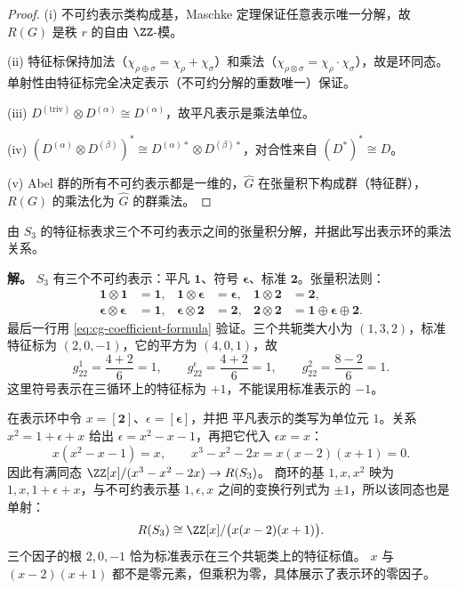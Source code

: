 \begin{proof}
(i) 不可约表示类构成基，Maschke 定理保证任意表示唯一分解，故 $R(G)$ 是秩 $r$ 的自由 $\ZZ$-模。

(ii) 特征标保持加法（$\chi_{\rho\oplus\sigma}=\chi_\rho+\chi_\sigma$）和乘法（$\chi_{\rho\otimes\sigma}=\chi_\rho\cdot\chi_\sigma$），故是环同态。单射性由特征标完全决定表示（不可约分解的重数唯一）保证。

(iii) $D^{(\mathrm{triv})}\otimes D^{(\alpha)}\cong D^{(\alpha)}$，故平凡表示是乘法单位。

(iv) $(D^{(\alpha)}\otimes D^{(\beta)})^*\cong D^{(\alpha)*}\otimes D^{(\beta)*}$，对合性来自 $(D^*)^*\cong D$。

(v) Abel 群的所有不可约表示都是一维的，$\hat G$ 在张量积下构成群（特征群），$R(G)$ 的乘法化为 $\hat G$ 的群乘法。
\end{proof}

\begin{example}[{$S_3$ 的表示环}]
由 $S_3$ 的特征标表求三个不可约表示之间的张量积分解，并据此写出表示环的乘法关系。

\textbf{解。} $S_3$ 有三个不可约表示：平凡 $\mathbf{1}$、符号 $\boldsymbol\epsilon$、标准 $\mathbf{2}$。张量积法则：
\begin{align*}
\mathbf{1}\otimes\mathbf{1}&=\mathbf{1},&\mathbf{1}\otimes\boldsymbol\epsilon&=\boldsymbol\epsilon,&\mathbf{1}\otimes\mathbf{2}&=\mathbf{2},\\
\boldsymbol\epsilon\otimes\boldsymbol\epsilon&=\mathbf{1},&\boldsymbol\epsilon\otimes\mathbf{2}&=\mathbf{2},&\mathbf{2}\otimes\mathbf{2}&=\mathbf{1}\oplus\boldsymbol\epsilon\oplus\mathbf{2}.
\end{align*}
最后一行用 \cref{eq:cg-coefficient-formula} 验证。三个共轭类大小为
$(1,3,2)$，标准特征标为 $(2,0,-1)$，它的平方为 $(4,0,1)$，故
\[
g_{22}^1=\frac{4+2}{6}=1,\qquad
g_{22}^\epsilon=\frac{4+2}{6}=1,\qquad
g_{22}^2=\frac{8-2}{6}=1.
\]
这里符号表示在三循环上的特征标为 $+1$，不能误用标准表示的 $-1$。

在表示环中令 $x=[\mathbf2]$、$\epsilon=[\boldsymbol\epsilon]$，并把
平凡表示的类写为单位元 $1$。关系 $x^2=1+\epsilon+x$ 给出
$\epsilon=x^2-x-1$，再把它代入 $\epsilon x=x$：
\[
x(x^2-x-1)=x,
\qquad x^3-x^2-2x=x(x-2)(x+1)=0.
\]
因此有满同态 $\ZZ[x]/(x^3-x^2-2x)\to R(S_3)$。
商环的基 $1,x,x^2$ 映为 $1,x,1+\epsilon+x$，与不可约表示基
$1,\epsilon,x$ 之间的变换行列式为 $\pm1$，所以该同态也是单射：
\[
R(S_3)\cong\ZZ[x]/\bigl(x(x-2)(x+1)\bigr).
\]
三个因子的根 $2,0,-1$ 恰为标准表示在三个共轭类上的特征标值。
$x$ 与 $(x-2)(x+1)$ 都不是零元素，但乘积为零，具体展示了表示环的零因子。
\end{example}

